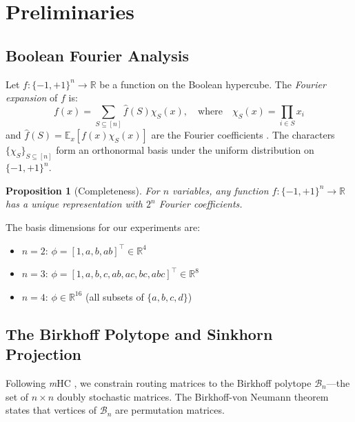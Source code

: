 \documentclass[Royal,times,sageh]{sagej}
\newcommand{\mHC}{\textit{m}HC}
\newtheorem{proposition}{Proposition}
\begin{document}
\section{Preliminaries}

\subsection{Boolean Fourier Analysis}

Let $f: \{-1, +1\}^n \to \mathbb{R}$ be a function on the Boolean hypercube. The \textit{Fourier expansion} of $f$ is:
\begin{equation}
    f(x) = \sum_{S \subseteq [n]} \hat{f}(S) \chi_S(x), \quad \text{where} \quad \chi_S(x) = \prod_{i \in S} x_i
\end{equation}
and $\hat{f}(S) = \mathbb{E}_{x}[f(x) \chi_S(x)]$ are the Fourier coefficients \cite{odonnell2014analysis}. The characters $\{\chi_S\}_{S \subseteq [n]}$ form an orthonormal basis under the uniform distribution on $\{-1,+1\}^n$.

\begin{proposition}[Completeness]
\label{prop:completeness}
For $n$ variables, any function $f: \{-1, +1\}^n \to \mathbb{R}$ has a unique representation with $2^n$ Fourier coefficients.
\end{proposition}

The basis dimensions for our experiments are:
\begin{itemize}
    \item $n=2$: $\phi = [1, a, b, ab]^\top \in \mathbb{R}^4$
    \item $n=3$: $\phi = [1, a, b, c, ab, ac, bc, abc]^\top \in \mathbb{R}^8$
    \item $n=4$: $\phi \in \mathbb{R}^{16}$ (all subsets of $\{a,b,c,d\}$)
\end{itemize}

\subsection{The Birkhoff Polytope and Sinkhorn Projection}

Following \mHC{} \cite{xie2024mhc}, we constrain routing matrices to the Birkhoff polytope $\mathcal{B}_n$---the set of $n \times n$ doubly stochastic matrices. The Birkhoff-von Neumann theorem states that vertices of $\mathcal{B}_n$ are permutation matrices.
\end{document}
